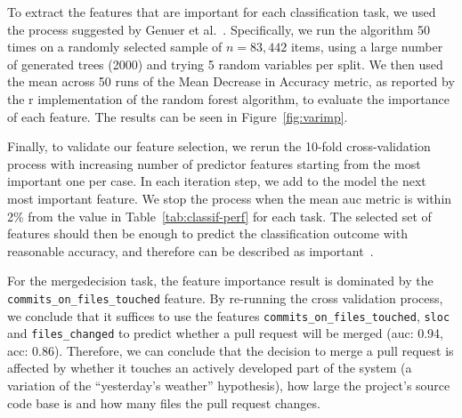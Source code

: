 \documentclass{sig-alternate}
\begin{document}
\begin{figure*}
\centering
{}
\caption{Random forest feature importance for predicting merge decision (a) and merge time (b)}
\label{fig:varimp}
\end{figure*}

To extract the features that are important for each classification task, we used
the process suggested by Genuer et al.~\cite{Genue10}. Specifically, we run the
algorithm 50 times on a randomly selected sample of $n = 83,442$ items, using a
large number of generated trees (2000) and trying 5 random variables per split.
We then used the mean across 50 runs of the  Mean Decrease in Accuracy metric,
as reported by the {\sc r} implementation of the random forest algorithm, to
evaluate the importance of each feature. The results can be seen in
Figure~\ref{fig:varimp}.

Finally, to validate our feature selection, we rerun the 10-fold
cross-validation process with increasing number of predictor features starting
from the most important one per case. In each iteration step, we add to the
model the next most important feature. We stop the process when the mean {\sc
auc} metric is within 2\% from the value in Table~\ref{tab:classif-perf} for
each task. The selected set of features should then be enough to predict the
classification outcome with reasonable accuracy, and therefore can be described
as important~\cite{Genue10}.

For the \textsf{mergedecision} task, the feature importance result is dominated
by the \texttt{commits\_\-on\_\-files\_\-touched} feature. By re-running the cross
validation process, we conclude that it suffices to use the features
 \texttt{commits\_\-on\_\-files\_\-touched}, \texttt{sloc} and \texttt{files\_changed}
to predict whether a pull request will be merged ({\sc auc:} 0.94, {\sc acc}:
0.86). Therefore, we can conclude that the decision to merge a pull request is
affected by whether it touches an actively developed part of the system (a
variation of the ``yesterday's weather'' hypothesis), how large the project's
source code base is and how many files the pull request changes.

\end{document}
